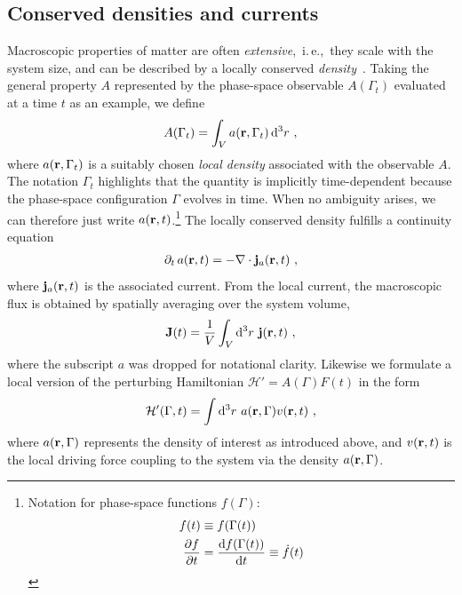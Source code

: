 \subsection{Conserved densities and currents}
Macroscopic properties of matter are often \emph{extensive},~i.\,e.,~they scale with the system size, and can be described by a locally conserved \emph{density}~\cite{Baroni2020a}. Taking the general property $A$ represented by the phase-space observable $A(\Gamma_t)$ evaluated at a time $t$ as an example, we define
\begin{align}
  A (\Gamma_t) = \int_V a (\b r, \Gamma_t) \, \d^3 r~,
  \label{eq:lr.A}
\end{align}
where $a({\bf r}, \Gamma_t)$ is a suitably chosen \emph{local density} associated with the observable $A$. The notation $\Gamma_t$ highlights that the quantity is implicitly time-dependent because the phase-space configuration $\Gamma$ evolves in time.
When no ambiguity arises, we can therefore just write $a ({\bf r}, t)$.\footnote{
	Notation for phase-space functions $f (\Gamma)$:
	\begin{align*}
	f(t) &\equiv f(\Gamma (t)) \\
	\frac{\partial f}{\partial t} &= \frac{{\rm d} f (\Gamma (t))}{{\rm d} t} \equiv \dot{f}(t)
	\end{align*}
}
The locally conserved density fulfills a continuity equation
\begin{align}
  \partial_t \, a(\b r, t) = - \b \nabla \cdot \b j_a (\b r, t)~,
  \label{eq:lr.continuity.1}
\end{align}
where ${\bf j}_a ({\bf r}, t)$ is the associated current. From the local current, the macroscopic flux is obtained by spatially averaging over the system volume,
\begin{align}
  \b J (t)
    = \frac{1}{V} \int_V \d^3 r ~ \b j (\b r, t)~,
  \label{eq:lr.J(t)}
\end{align}
where the subscript $a$ was dropped for notational clarity.
Likewise we formulate a local version of the perturbing Hamiltonian \mbox{$\mathcal H' = A (\Gamma) F(t)$} in the form
\begin{align}
	\mathcal H' (\Gamma, t) = \int \d^3 r ~ a (\b r, \Gamma) v(\b r, t)~,
	\label{eq:lr.H'}
\end{align}
where $a({\bf r}, \Gamma)$ represents the density of interest as introduced above, and $v({\bf r}, t)$ is the local driving force coupling to the system via the density $a ({\bf r}, \Gamma)$.

